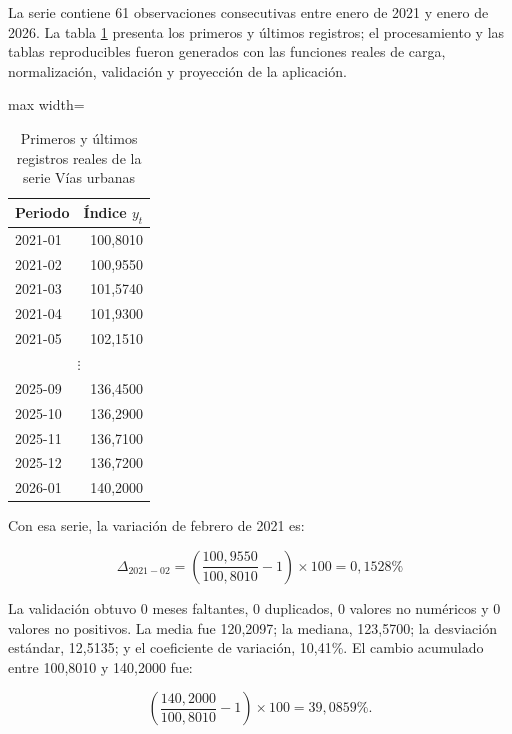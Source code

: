 \documentclass[12pt,letterpaper]{article}
\begin{document}
La serie contiene 61 observaciones consecutivas entre enero de 2021 y enero de 2026. La tabla \ref{tab:ejemplo_serie_icociv} presenta los primeros y últimos registros; el procesamiento y las tablas reproducibles fueron generados con las funciones reales de carga, normalización, validación y proyección de la aplicación.

\begin{table}[H]
\centering
\caption{Primeros y últimos registros reales de la serie Vías urbanas}
\label{tab:ejemplo_serie_icociv}
\vspace{\baselineskip}
\scriptsize
\begin{adjustbox}{max width=\textwidth}
\begin{tabular}{lr}
\toprule
\textbf{Periodo} & \textbf{Índice \(y_t\)} \\
\midrule
2021-01 & 100,8010 \\
2021-02 & 100,9550 \\
2021-03 & 101,5740 \\
2021-04 & 101,9300 \\
2021-05 & 102,1510 \\
\multicolumn{2}{c}{\(\vdots\)} \\
2025-09 & 136,4500 \\
2025-10 & 136,2900 \\
2025-11 & 136,7100 \\
2025-12 & 136,7200 \\
2026-01 & 140,2000 \\
\bottomrule
\end{tabular}
\end{adjustbox}
\end{table}

Con esa serie, la variación de febrero de 2021 es:

\begin{equation}
\Delta_{2021-02} = \left(\frac{100,9550}{100,8010}-1\right)\times 100 = 0,1528\%
\end{equation}

La validación obtuvo 0 meses faltantes, 0 duplicados, 0 valores no numéricos y 0 valores no positivos. La media fue 120,2097; la mediana, 123,5700; la desviación estándar, 12,5135; y el coeficiente de variación, 10,41\%. El cambio acumulado entre 100,8010 y 140,2000 fue:

\begin{equation}
\left(\frac{140,2000}{100,8010}-1\right)\times100=39,0859\%.
\end{equation}
\end{document}
